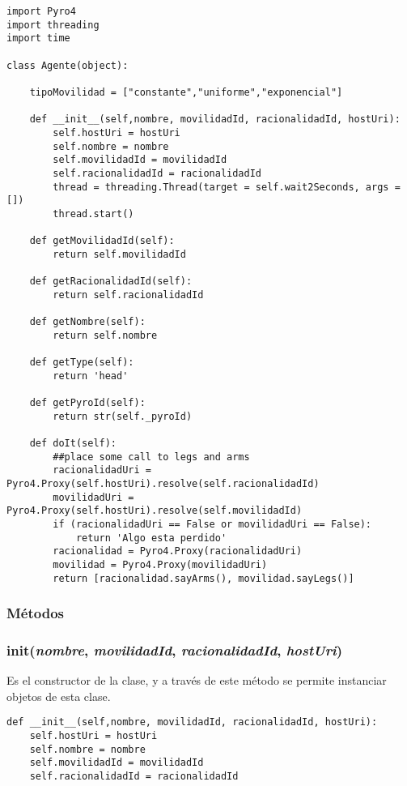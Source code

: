 \documentclass{article}
\begin{document}
\begin{lstlisting}
import Pyro4
import threading
import time

class Agente(object):
    
    tipoMovilidad = ["constante","uniforme","exponencial"]    
    
    def __init__(self,nombre, movilidadId, racionalidadId, hostUri):
        self.hostUri = hostUri
        self.nombre = nombre
        self.movilidadId = movilidadId
        self.racionalidadId = racionalidadId
        thread = threading.Thread(target = self.wait2Seconds, args = [])
        thread.start()

    def getMovilidadId(self):
        return self.movilidadId

    def getRacionalidadId(self):
        return self.racionalidadId
        
    def getNombre(self):
        return self.nombre
        
    def getType(self):
        return 'head'

    def getPyroId(self):
        return str(self._pyroId)

    def doIt(self):
        ##place some call to legs and arms
        racionalidadUri = Pyro4.Proxy(self.hostUri).resolve(self.racionalidadId)
        movilidadUri =  Pyro4.Proxy(self.hostUri).resolve(self.movilidadId)
        if (racionalidadUri == False or movilidadUri == False):
            return 'Algo esta perdido'
        racionalidad = Pyro4.Proxy(racionalidadUri)
        movilidad = Pyro4.Proxy(movilidadUri)
        return [racionalidad.sayArms(), movilidad.sayLegs()]
\end{lstlisting}

\subsubsection*{\textbf{Métodos}}

\subsubsection{\textbf{init}(\textit{nombre}, \textit{movilidadId}, \textit{racionalidadId}, \textit{hostUri})}
Es el constructor de la clase, y a través de este método se permite instanciar objetos de esta clase.
\begin{lstlisting}
def __init__(self,nombre, movilidadId, racionalidadId, hostUri):
	self.hostUri = hostUri
	self.nombre = nombre
	self.movilidadId = movilidadId
	self.racionalidadId = racionalidadId
\end{lstlisting}
\end{document}
